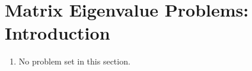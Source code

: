 \section{Matrix Eigenvalue Problems: Introduction}

\begin{enumerate}
    \item No problem set in this section.
\end{enumerate}